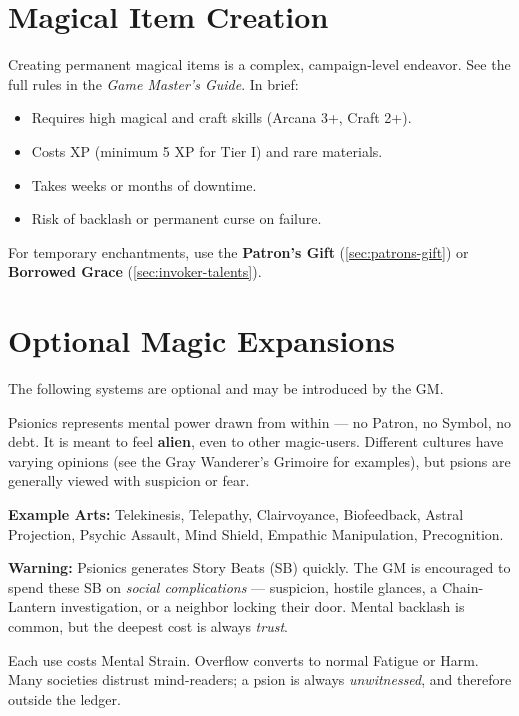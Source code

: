 \section{Magical Item Creation}
\label{sec:magic-item-creation}

Creating permanent magical items is a complex, campaign-level endeavor. See the full rules in the \textit{Game Master's Guide}. In brief:

\begin{itemize}
  \item Requires high magical and craft skills (Arcana 3+, Craft 2+).
  \item Costs XP (minimum 5 XP for Tier I) and rare materials.
  \item Takes weeks or months of downtime.
  \item Risk of backlash or permanent curse on failure.
\end{itemize}

For temporary enchantments, use the \textbf{Patron's Gift} (\ref{sec:patrons-gift}) or \textbf{Borrowed Grace} (\ref{sec:invoker-talents}).

\section{Optional Magic Expansions}
\label{sec:optional-magic}

The following systems are optional and may be introduced by the GM.

\begin{tcolorbox}[colback=blue!5!white,colframe=blue!75!black,title=Psionics (Optional),breakable]
Psionics represents mental power drawn from within --- no Patron, no Symbol, no debt. It is meant to feel \textbf{alien}, even to other magic-users. Different cultures have varying opinions (see the Gray Wanderer's Grimoire for examples), but psions are generally viewed with suspicion or fear.

\medskip
\textbf{Example Arts:} Telekinesis, Telepathy, Clairvoyance, Biofeedback, Astral Projection, Psychic Assault, Mind Shield, Empathic Manipulation, Precognition.

\medskip
\textbf{Warning:} Psionics generates Story Beats (SB) quickly. The GM is encouraged to spend these SB on \textit{social complications} --- suspicion, hostile glances, a Chain-Lantern investigation, or a neighbor locking their door. Mental backlash is common, but the deepest cost is always \textit{trust}.

\medskip
Each use costs Mental Strain. Overflow converts to normal Fatigue or Harm. Many societies distrust mind-readers; a psion is always \textit{unwitnessed}, and therefore outside the ledger.
\end{tcolorbox}


